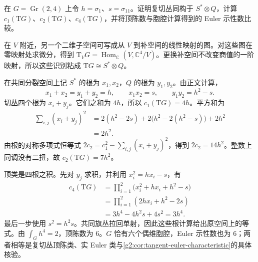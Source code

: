 \begin{exercise}\label{g2:ex:gr24-tangent-chern-numbers}
	在 \(G=\operatorname{Gr}(2,4)\) 上令 \(h=\sigma_1\)、\(s=\sigma_{11}\)。证明复切丛同构于 \(S^*\otimes Q\)，计算 \(c_1(\mathrm TG)\)、\(c_2(\mathrm TG)\)、\(c_4(\mathrm TG)\)，并将顶陈数与胞腔计算得到的 Euler 示性数比较。
\end{exercise}
\begin{solution}
	在 \(V\) 附近，另一个二维子空间可写成从 \(V\) 到补空间的线性映射的图。对这些图在零映射处求微分，得到 \(\mathrm T_VG=\operatorname{Hom}_{\mathbb C}(V,\mathbb C^4/V)\)。更换补空间不改变商值的一阶映射，所以这些识别粘成 \(\mathrm TG\cong S^*\otimes Q\)。

	在共同分裂空间上记 \(S^*\) 的根为 \(x_1,x_2\)，\(Q\) 的根为 \(y_1,y_2\)。由正文计算，
	\[
		x_1+x_2=y_1+y_2=h,\qquad x_1x_2=s,\qquad y_1y_2=h^2-s.
	\]
	切丛四个根为 \(x_i+y_j\)。它们之和为 \(4h\)，所以 \(c_1(\mathrm TG)=4h\)。平方和为
	\[
	\begin{aligned}
		\sum_{i,j}(x_i+y_j)^2
		&=2(h^2-2s)+2\bigl(h^2-2(h^2-s)\bigr)+2h^2\\
		&=2h^2.
	\end{aligned}
	\]
	由根的对称多项式恒等式 \(2c_2=c_1^2-\sum_{i,j}(x_i+y_j)^2\)，得到 \(2c_2=14h^2\)。整数上同调没有二扭，故 \(c_2(\mathrm TG)=7h^2\)。

	顶类是四根之积。先对 \(y_j\) 求积，并利用 \(x_i^2=hx_i-s\)，有
	\[
	\begin{aligned}
		c_4(\mathrm TG)
		&=\prod_{i=1}^2\bigl(x_i^2+hx_i+h^2-s\bigr)\\
		&=\prod_{i=1}^2(2hx_i+h^2-2s)\\
		&=3h^4-4h^2s+4s^2=3h^4.
	\end{aligned}
	\]
	最后一步使用 \(s^2=h^2s\)。共同旗丛拉回单射，因此这些根计算给出原空间上的等式。由 \(\int_Gh^4=2\)，顶陈数为 \(6\)。\(G\) 恰有六个偶维胞腔，Euler 示性数也为 \(6\)；两者相等是复切丛顶陈类、实 Euler 类与\cref{g2:cor:tangent-euler-characteristic}的具体核验。
\end{solution}

